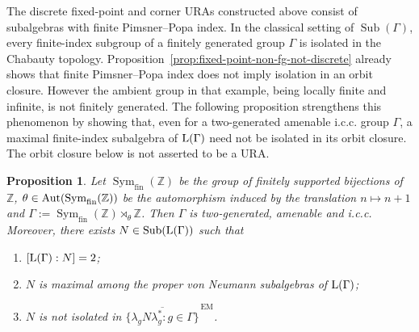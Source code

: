 \documentclass[12pt]{amsart} %
\theoremstyle{plain}
\newtheorem{proposition}[theorem]{Proposition}
\theoremstyle{definition}
\newcommand{\Z}{\mathbb{Z}}
\newcommand{\LL}{{\rm L}}
\newcommand{\Aut}{{\rm Aut}}
\DeclareMathOperator{\Sub}{Sub}
\begin{document}
\noindent The discrete fixed-point and corner URAs constructed
above consist of subalgebras with finite Pimsner--Popa index. In the
classical setting of $\Sub(\Gamma)$, every finite-index subgroup of a
finitely generated group $\Gamma$ is isolated in the Chabauty topology.
Proposition~\ref{prop:fixed-point-non-fg-not-discrete} already shows that
finite Pimsner--Popa index does not imply isolation in an orbit closure. However the
ambient group in that example, being locally finite and infinite, is not finitely generated. The following
proposition strengthens this phenomenon by showing that, even for a
two-generated amenable i.c.c.
group $\Gamma$, a maximal finite-index subalgebra of $\LL(\Gamma)$ need not
be isolated in its orbit closure. The orbit closure below is not asserted to
be a URA.
\begin{proposition}\label{ex:finitely-generated-nonisolation}
Let $\operatorname{Sym}_{\mathrm{fin}}(\Z)$ be the group of finitely supported bijections of $\Z$,
$\theta\in\Aut(\operatorname{Sym}_{\mathrm{fin}}(\Z))$ be the automorphism induced by the translation $n\mapsto n+1$ and $\Gamma:=\operatorname{Sym}_{\mathrm{fin}}(\Z)\rtimes_\theta\Z$.
Then $\Gamma$ is two-generated, amenable and i.c.c. Moreover, there exists
$N\in\Sub(\LL(\Gamma))$ such that
\begin{enumerate}
\item $[\LL(\Gamma):N]=2$;
\item $N$ is maximal among the proper von Neumann subalgebras of
$\LL(\Gamma)$;
\item $N$ is not isolated in
$\overline{\{\lambda_gN\lambda_g^*:g\in\Gamma\}}^{\,\mathrm{EM}}$.
\end{enumerate}
\end{proposition}
\end{document}
